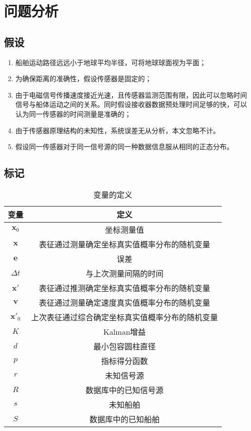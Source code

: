 \clearpage
\section{问题分析}
\subsection{假设}
\begin{enumerate}
	\item 船舶运动路径远远小于地球平均半径，可将地球球面视为平面；
	\item 为确保距离的准确性，假设传感器是固定的；
	\item 由于电磁信号传播速度接近光速，且传感器监测范围有限，因此可以忽略时间信号与船体运动之间的关系。同时假设接收器数据预处理时间足够的快，可以认为同一传感器的时间测量是准确的；
	\item 由于传感器原理结构的未知性，系统误差无从分析，本文忽略不计。
	\item 假设同一传感器对于同一信号源的同一种数据信息服从相同的正态分布。
\end{enumerate}
\subsection{标记}
\begin{table}[htbp]
	\centering
	\caption{变量的定义}
	\begin{tabular}{cc}
		\toprule
		变量				&	定义												\\
		\midrule
		\(\bm{x}_0\)		&	坐标测量值										\\
		\(\bm{x}\)			&	表征通过测量确定坐标真实值概率分布的随机变量		\\
		\(\bm{e}\)			&	误差												\\
		\(\Delta t\)		&	与上次测量间隔的时间								\\
		\(\bm{x}\bm{'}\)	&	表征通过推测确定坐标真实值概率分布的随机变量		\\
		\(\bm{v}\)			&	表征通过测量确定速度真实值概率分布的随机变量		\\
		\(\bm{x}\bm{'}_0\)	&	上次表征通过综合确定坐标真实值概率分布的随机变量	\\
		\(K\)				&	Kalman增益										\\
		\(d\)				&	最小包容圆柱直径									\\
		\(p\)				&	指标得分函数										\\
		\(r\)				&	未知信号源										\\
		\(R\)				&	数据库中的已知信号源								\\
		\(s\)				&	未知船舶											\\
		\(S\)				&	数据库中的已知船舶								\\
		\bottomrule
	\end{tabular}
\end{table}

